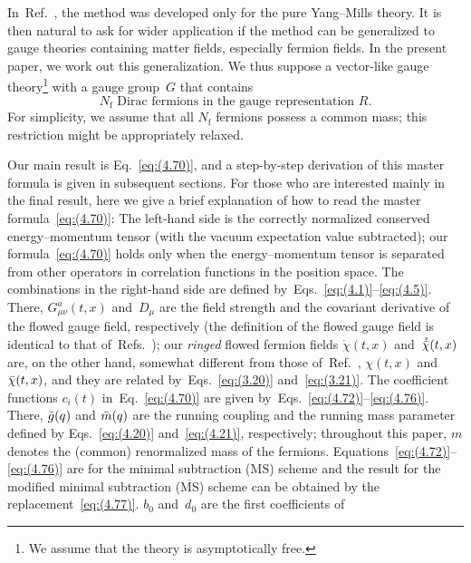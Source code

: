 In~Ref.~\cite{Suzuki:2013gza}, the method was developed only for the pure
Yang--Mills theory. It is then natural to ask for wider application if the
method can be generalized to gauge theories containing matter fields,
especially fermion fields. In the present paper, we work out this
generalization. We thus suppose a vector-like gauge theory\footnote{We assume
that the theory is asymptotically free.} with a gauge group~$G$ that contains
\begin{equation}
   \text{$N_{\mathrm{f}}$ Dirac fermions in the gauge representation~$R$}.
\label{eq:(1.1)}
\end{equation}
For simplicity, we assume that all $N_{\mathrm{f}}$ fermions possess a common mass; this
restriction might be appropriately relaxed.

Our main result is Eq.~\eqref{eq:(4.70)}, and a step-by-step derivation of this
master formula is given in subsequent sections. For those who are interested
mainly in the final result, here we give a brief explanation of how to read the
master formula~\eqref{eq:(4.70)}: The left-hand side is the
correctly normalized conserved energy--momentum tensor (with the vacuum
expectation value subtracted); our formula~\eqref{eq:(4.70)} holds only when
the energy--momentum tensor is separated from other operators in correlation
functions in the position space. The combinations in the right-hand side are
defined by~Eqs.~\eqref{eq:(4.1)}--\eqref{eq:(4.5)}. There, $G_{\mu\nu}^a(t,x)$
and~$D_\mu$ are the field strength and the covariant derivative of the flowed
gauge field, respectively (the definition of the flowed gauge field is
identical to that
of~Refs.~\cite{Luscher:2010iy,Luscher:2011bx,Luscher:2013cpa}); our
\emph{ringed\/} flowed fermion fields
$\mathring{{\chi}}(t,x)$ and~$\mathring{\Bar{\chi}}(t,x)$ are, on the other
hand, somewhat different from those of~Ref.~\cite{Luscher:2013cpa}, $\chi(t,x)$
and~$\Bar{\chi}(t,x)$, and they are related by~Eqs.~\eqref{eq:(3.20)}
and~\eqref{eq:(3.21)}. The coefficient functions $c_i(t)$
in~Eq.~\eqref{eq:(4.70)} are given
by~Eqs.~\eqref{eq:(4.72)}--\eqref{eq:(4.76)}. There, $\Bar{g}(q)$ and
$\Bar{m}(q)$ are the running coupling and the running mass parameter defined by
Eqs.~\eqref{eq:(4.20)} and~\eqref{eq:(4.21)}, respectively; throughout this
paper, $m$ denotes the (common) renormalized mass of the fermions.
Equations~\eqref{eq:(4.72)}--\eqref{eq:(4.76)} are for the minimal subtraction
($\text{MS}$) scheme and the result for the modified minimal subtraction
($\overline{\text{MS}}$) scheme can be obtained by the
replacement~\eqref{eq:(4.77)}. $b_0$ and~$d_0$ are the first coefficients of

